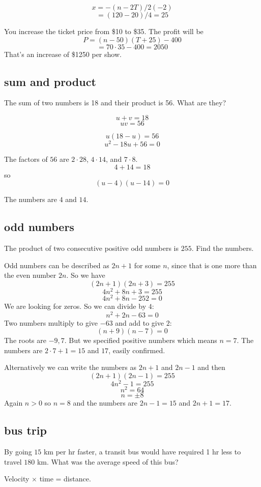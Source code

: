 \documentclass[11pt, oneside]{article}
\begin{document}
\[ x  = -(n - 2T)/2(-2) \]
\[   = (120 - 20)/4 = 25 \]

You increase the ticket price from \$10 to \$35.  The profit will be
\[ P = (n - 50)(T + 25) - 400 \]
\[ = 70 \cdot 35 - 400 = 2050 \]
That's an increase of \$1250 per show.

\subsection*{sum and product}

The sum of two numbers is 18 and their product is 56.  What are they?

\[ u + v = 18 \]
\[ uv = 56 \]

\[ u(18 - u) = 56 \]
\[ u^2 - 18u + 56 = 0 \]

The factors of $56$ are $2 \cdot 28$, $4 \cdot 14$, and $7 \cdot 8$.
\[ 4 + 14 = 18 \]
so
\[ (u - 4)(u - 14) = 0 \]

The numbers are $4$ and $14$.

\subsection*{odd numbers}
The product of two consecutive positive odd numbers is $255$.  Find the numbers.

Odd numbers can be described as $2n+1$ for some $n$, since that is one more than the even number $2n$.  So we have
\[ (2n + 1)(2n + 3) = 255 \]
\[ 4n^2 + 8n + 3 = 255 \]
\[ 4n^2 + 8n - 252 = 0 \]
We are looking for zeros.  So we can divide by $4$:
\[ n^2 + 2n - 63 = 0 \]
Two numbers multiply to give $-63$ and add to give $2$:
\[ (n + 9)(n - 7) = 0 \]
The roots are $-9, 7$.  But we specified positive numbers which means $n = 7$.  The numbers are $2 \cdot 7 + 1 = 15$ and $17$, easily confirmed.

Alternatively we can write the numbers as $2n + 1$ and $2n - 1$ and then
\[ (2n + 1)(2n - 1) = 255 \]
\[ 4n^2 - 1 = 255 \]
\[ n^2 = 64 \]
\[ n = \pm 8 \]
Again $n > 0$ so $n = 8$ and the numbers are $2n - 1 = 15$ and $2n + 1 = 17$.

\subsection*{bus trip}

By going $15$ km per hr faster, a transit bus would have required 1 hr less to travel $180$ km. What was the average speed of this bus?

Velocity $\times$ time = distance.
\end{document}
